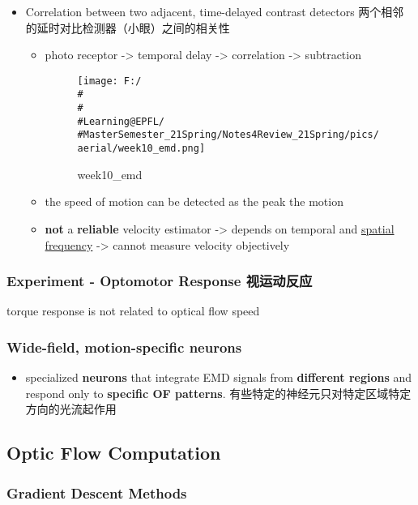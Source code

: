 \documentclass[]{article}
\begin{document}
\begin{itemize}
\item
  Correlation between two adjacent, time-delayed contrast detectors
  \textbar{} 两个相邻的延时对比检测器（小眼）之间的相关性

  \begin{itemize}
  \item
    photo receptor -\textgreater{} temporal delay -\textgreater{}
    correlation -\textgreater{} subtraction

    \begin{figure}
    \centering
    \texttt{[image: F:/\\\#\\\#\\\#Learning@EPFL/\\\#MasterSemester\_21Spring/Notes4Review\_21Spring/pics/aerial/week10\_emd.png]}
    \caption{week10\_emd}
    \end{figure}
  \item
    the speed of motion can be detected as the peak the motion
  \item
    \textbf{not} a \textbf{reliable} velocity estimator -\textgreater{}
    depends on temporal and \underline{spatial frequency}
    -\textgreater{} cannot measure velocity objectively
  \end{itemize}
\end{itemize}

\subsubsection{Experiment - Optomotor Response
视运动反应}\label{header-n2408}

torque response is not related to optical flow speed

\subsubsection{Wide-field, motion-specific neurons}\label{header-n2410}

\begin{itemize}
\item
  specialized \textbf{neurons} that integrate EMD signals from
  \textbf{different regions} and respond only to \textbf{specific OF
  patterns}. 有些特定的神经元只对特定区域特定方向的光流起作用
\end{itemize}

\subsection{Optic Flow Computation}\label{header-n2414}

\subsubsection{Gradient Descent Methods}\label{header-n2415}
\end{document}

